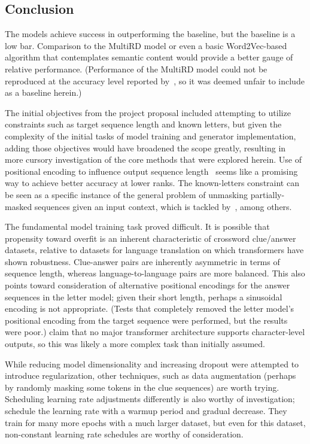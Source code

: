 \documentclass[letterpaper]{article} %
\begin{document}
\begin{NoHyper}
\section{Conclusion}
\label{sec:conclusion}

The models achieve success in outperforming the baseline, but the baseline is a low bar.
Comparison to the MultiRD model or even a basic Word2Vec-based algorithm that contemplates semantic content would provide a better gauge of relative performance.
(Performance of the MultiRD model could not be reproduced at the accuracy level reported by~\citeauthor{zhang2019multichannel}, so it was deemed unfair to include as a baseline herein.)

The initial objectives from the project proposal included attempting to utilize constraints such as target sequence length and known letters, but given the complexity of the initial tasks of model training and generator implementation, adding those objectives would have broadened the scope greatly, resulting in more cursory investigation of the core methods that were explored herein.
Use of positional encoding to influence output sequence length~\cite{takase2019positional} seems like a promising way to achieve better accuracy at lower ranks.
The known-letters constraint can be seen as a specific instance of the general problem of unmasking partially-masked
sequences given an input context, which is tackled by~\citealp{raffel2023exploring}, among others.

The fundamental model training task proved difficult.
It is possible that propensity toward overfit is an inherent characteristic of crossword clue/answer datasets, relative
to datasets for language translation on which transformers have shown robustness.
Clue-answer pairs are inherently asymmetric in terms of sequence length, whereas language-to-language pairs are more balanced.
This also points toward consideration of alternative positional encodings for the answer sequences in the letter model;
given their short length, perhaps a sinusoidal encoding is not appropriate.
(Tests that completely removed the letter model's positional encoding from the target sequence were performed, but the results were poor.)
\citeauthor{kulshreshtha2022across} claim that no major transformer architecture supports character-level outputs, so
this was likely a more complex task than initially assumed.

While reducing model dimensionality and increasing dropout were attempted to introduce regularization, other
techniques, such as data augmentation (perhaps by randomly masking some tokens in the clue sequences) are worth trying.
Scheduling learning rate adjustments differently is also worthy of investigation; \citeauthor{vaswani2017} schedule the
learning rate with a warmup period and gradual decrease.
They train for many more epochs with a much larger dataset, but even for this dataset, non-constant learning rate
schedules are worthy of consideration.


\end{NoHyper}
\end{document}
